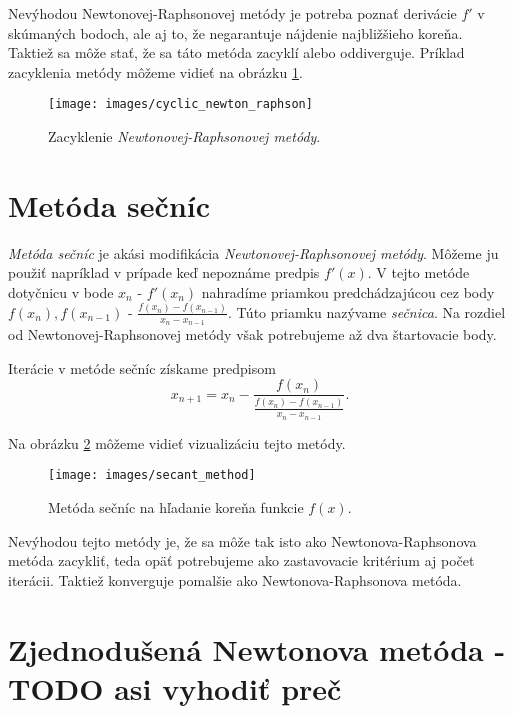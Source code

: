 Nevýhodou Newtonovej-Raphsonovej metódy je potreba poznať derivácie $f'$ v skúmaných bodoch, ale aj to, 
že negarantuje nájdenie
najbližšieho koreňa. Taktiež sa môže stať, že sa táto metóda zacyklí alebo oddiverguje. 
Príklad zacyklenia metódy môžeme vidieť
na obrázku \ref{obr:cyclic_newton_raphson}.

\begin{figure}
    \centerline{\texttt{[image: images/cyclic\_newton\_raphson]}}
    \caption[Zacyklenie Newtonovej-Raphsonovej metódy]{Zacyklenie \textit{Newtonovej-Raphsonovej metódy}.}
    \label{obr:cyclic_newton_raphson}
\end{figure}
\iffalse

\section{Metóda sečníc}

\textit{Metóda sečníc} je akási modifikácia \textit{Newtonovej-Raphsonovej metódy}. 
Môžeme ju použiť napríklad v prípade keď nepoznáme predpis $f'(x)$. 
V tejto metóde dotyčnicu v bode $x_n$ - $f'(x_n)$ nahradíme priamkou 
predchádzajúcou cez body $f(x_n), f(x_{n-1})$ - $\frac{f(x_n) - f(x_{n-1})}{x_n - x_{n-1}}$. 
Túto priamku nazývame \textit{sečnica}. 
Na rozdiel od Newtonovej-Raphsonovej metódy však potrebujeme až dva štartovacie body.

Iterácie v metóde sečníc získame predpisom
$$ x_{n+1} = x_n - \frac{f(x_n)}{\frac{f(x_n) - f(x_{n-1})}{x_n - x_{n-1}}}.$$

Na obrázku \ref{obr:secant_method} môžeme vidieť vizualizáciu tejto metódy.

\begin{figure}
    \centerline{\texttt{[image: images/secant\_method]}}
    \caption[Metóda sečníc]{Metóda sečníc na hľadanie koreňa funkcie $f(x)$.}
    \label{obr:secant_method}
\end{figure}

Nevýhodou tejto metódy je, že sa môže tak isto ako Newtonova-Raphsonova metóda zacykliť, teda 
opäť potrebujeme ako zastavovacie kritérium aj počet iterácii. Taktiež konverguje
pomalšie ako Newtonova-Raphsonova metóda.

\section{Zjednodušená Newtonova metóda - TODO asi vyhodiť preč}

